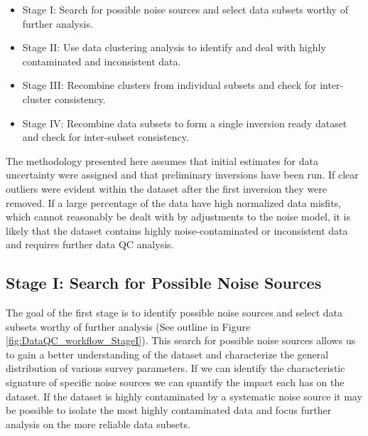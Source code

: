 \documentclass[final,authoryear,5p,times,twocolumn]{elsarticle}
\begin{document}
\begin{itemize}
    \item Stage I: Search for possible noise sources and select data subsets worthy of further analysis.
    \item Stage II: Use data clustering analysis to identify and deal with highly contaminated and inconsistent data.
    \item Stage III: Recombine clusters from individual subsets and check for inter-cluster consistency.
    \item Stage IV: Recombine data subsets to form a single inversion ready dataset and check for inter-subset consistency.
\end{itemize}

The methodology presented here assumes that initial estimates for data uncertainty were assigned and that preliminary inversions have been run. If clear outliers were evident within the dataset after the first inversion they were removed. If a large percentage of the data have high normalized data misfits, which cannot reasonably be dealt with by adjustments to the noise model, it is likely that the dataset contains highly noise-contaminated or inconsistent data and requires further data QC analysis.

\subsection{Stage I: Search for Possible Noise Sources}
\label{Data_Quality_Control:StageI}
The goal of the first stage is to identify possible noise sources and select data subsets worthy of further analysis (See outline in Figure \ref{fig:DataQC_workflow_StageI}). This search for possible noise sources allows us to gain a better understanding of the dataset and characterize the general distribution of various survey parameters. If we can identify the characteristic signature of specific noise sources we can quantify the impact each has on the dataset. If the dataset is highly contaminated by a systematic noise source it may be possible to isolate the most highly contaminated data and focus further analysis on the more reliable data subsets.
\end{document}
